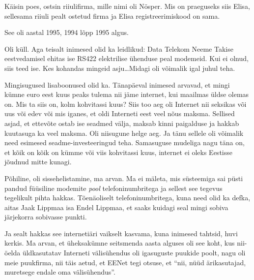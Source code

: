 Käisin poes, ostsin riiulifirma, mille nimi oli Nösper. Mis  on praeguseks siis Elisa, sellesama  riiuli pealt ostetud firma ja Elisa registreerimiskood on sama. 


See oli aastal 1995, 1994 lõpp 1995 algus.


Oli küll. Aga teisalt inimesed olid ka leidlikud: Data Telekom Neeme Takise eestvedamisel ehitas ise RS422 elektrilise ühenduse peal modemeid. Kui ei olnud, siis teed ise. Kes kohandas mingeid asju\ldots Midagi oli võimalik igal juhul teha.


Mingisugused lisaboonused olid ka. Tänapäeval inimesed arvavad, et mingi kümne euro eest kuus peaks tulema nii jäme internet, kui maailmas üldse olemas on. Mis ta siis on, kolm kohvitassi kuus? Siis too aeg oli Internet nii  seksikas või uus või edev või mis iganes, et oldi Interneti eest veel nõus maksma. Sellised asjad, et ettevõte ostab ise seadmed välja, maksab kinni paigalduse ja hakkab kuutasuga ka veel maksma. Oli niisugune helge aeg. Ja  tänu sellele oli võimalik need esimesed seadme-investeeringud teha. Samasuguse mudeliga nagu täna on, et kõik on kõik on kümme või viis kohvitassi kuus, internet ei oleks Eestisse jõudnud mitte kunagi.


Põhiline, oli sissehelistamine, ma arvan. Ma ei mäleta, mis süsteemiga sai püsti pandud füüsiline modemite \emph{pool} telefoninumbritega  ja sellest see tegevus tegelikult pihta hakkas. Tõenäoliselt telefoninumbritega, kuna need olid ka defka, aitas Jaak Lippmaa isa Endel Lippmaa, et saaks kuidagi seal mingi sobiva järjekorra sobivasse punkti.

Ja sealt  hakkas see internetiäri vaikselt kasvama, kuna inimesed tahtsid, huvi kerkis. Ma arvan, et üheksakümne seitsmenda  aasta alguses oli see koht, kus  nii-öelda üldkasutatav Interneti välisühendus oli igasuguste puukide poolt, nagu oli meie puukfirma, nii täis aetud, et EENet tegi otsuse, et \enquote{nii, nüüd ärikasutajad, muretsege endale oma välisühendus}.

